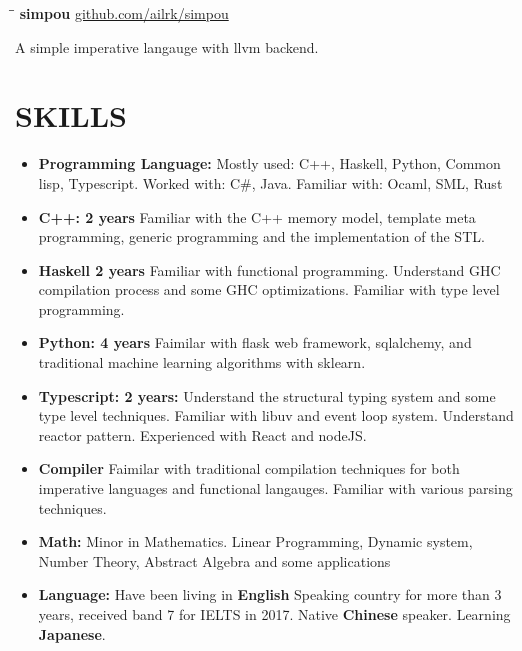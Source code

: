 \documentclass{res}
\begin{document}
\begin{resume}
    \vspace{-0.2in}
    \begin{tabbing}
        \hspace{2.4in}\= \hspace{0.9in}\= \kill
        {\bf simpou } \>               \>\url{github.com/ailrk/simpou}\\

    \end{tabbing}\vspace{-30pt}
    A simple imperative langauge with llvm backend.


\section{SKILLS}
    \begin{itemize}[leftmargin=-.2in]
        \setlength\itemsep{-1em}
        \item \textbf{Programming Language:} Mostly used: C++, Haskell, Python, Common lisp, Typescript. Worked with: C\#, Java. Familiar with: Ocaml, SML, Rust \\
        \item \textbf{C++: 2 years}
          Familiar with the C++ memory model, template meta programming,
          generic programming and the implementation of the STL.  \\
        \item \textbf{Haskell 2 years}
          Familiar with functional programming.
          Understand GHC compilation process and some GHC optimizations.
          Familiar with type level programming.\\
        \item \textbf{Python: 4 years}
          Faimilar with flask web framework, sqlalchemy, and
          traditional machine learning algorithms with sklearn. \\
        \item \textbf{Typescript: 2 years:} Understand the structural typing system and some type level techniques. Familiar with libuv and event loop system. Understand reactor pattern. Experienced with React and nodeJS. \\
        \item \textbf{Compiler} Faimilar with traditional compilation techniques for both imperative languages and functional langauges. Familiar with various parsing techniques. \\
        \item \textbf{Math:} Minor in Mathematics. Linear Programming, Dynamic system, Number Theory, Abstract Algebra and some applications \\
        \item \textbf{Language:} Have been living in \textbf{English} Speaking country for more than 3 years, received band 7 for IELTS in 2017. Native \textbf{Chinese} speaker. Learning \textbf{Japanese}.
    \end{itemize}

\end{resume}
\end{document}

